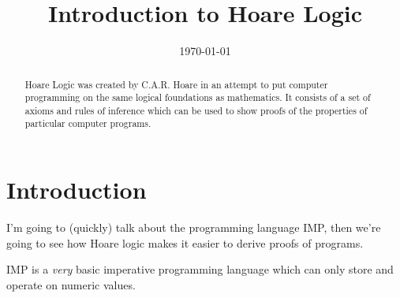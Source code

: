 \documentclass[11pt]{article}
\newcommand{\tinyspace}{\mspace{1mu}}
\begin{document}


\def\<{\langle}
\def\>{\rangle}
\def\N{\mathbb{N}}
\def\Nwz{\mathbb{N}_0}
\def\Q{\mathbb{Q}}
\def\C{\mathbb{C}}
\def\R{\mathbb{R}}
\def\eps{\varepsilon}
\newcommand{\fid}{\operatorname{F}}
\newcommand{\h}{\mathcal{H}}
\newcommand{\norm}[1]{\left\lVert\tinyspace#1\tinyspace\right\rVert}
\newtheorem{theorem}{\bf Theorem}[section]
\newtheorem{lem}{Lemma}[section]
\newtheorem{condition}{\bf Condition}[section]
\newtheorem{corollary}{\bf Corollary}[section]
\newtheorem{proposition}{Proposition}
\newtheorem{observation}{Observation}
\newtheorem{conj}{Conjecture}
\newcommand{\bra}[1]{\langle #1|}
\newcommand{\ket}[1]{|#1\rangle}
\newcommand{\braket}[3]{\langle #1|#2|#3\rangle}
\newcommand{\ip}[2]{\langle #1|#2\rangle}
\newcommand{\op}[2]{|#1\rangle \langle #2|}
\newcommand{\symm}[1]{{\mathfrak S}_{#1}}
\newcommand{\unitary}[1]{U_{#1}}
\newcommand{\srep}{{\mathtt P}}
\newcommand{\urep}{{\mathtt Q}}

\newcommand{\tr}{{\rm tr}}
\newcommand {\E } {{\mathcal{E}}}
\newcommand {\F } {{\mathcal{F}}}
\newcommand {\diag } {{\rm diag}}

\title{Introduction to Hoare Logic}
\author{ 
}
\date{\today}


\maketitle

\begin{abstract}
Hoare Logic was created by C.A.R. Hoare in an attempt to put computer programming on the same logical foundations as mathematics. It consists of a set of axioms and rules of inference which can be used to show proofs of the properties of particular computer programs.
\end{abstract}

\section{Introduction}

I'm going to (quickly) talk about the programming language IMP, then we're going to see how Hoare logic makes it easier to derive proofs of programs.

IMP is a \textit{very} basic imperative programming language which can only store and operate on numeric values.
\end{document}
